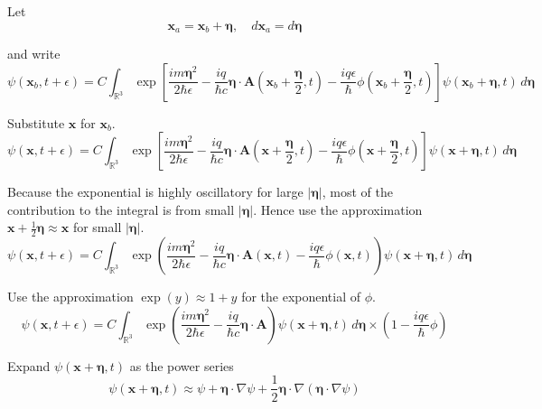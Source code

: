 Let
\begin{equation*}
\mathbf x_a=\mathbf x_b+\boldsymbol\eta,\quad
d\mathbf x_a=d\boldsymbol\eta
\end{equation*}

and write
\begin{equation*}
\psi(\mathbf x_b,t+\epsilon)
=C\int_{\mathbb R^3}
\exp\left[\frac{im\boldsymbol\eta^2}{2\hbar\epsilon}
-\frac{iq}{\hbar c}
\boldsymbol\eta\cdot\mathbf A\left(\mathbf x_b+\frac{\boldsymbol\eta}{2},t\right)
-\frac{iq\epsilon}{\hbar}\phi\left(\mathbf x_b+\frac{\boldsymbol\eta}{2},t\right)
\right]
\psi(\mathbf x_b+\boldsymbol\eta,t)
\,d\boldsymbol\eta
\end{equation*}

Substitute $\mathbf x$ for $\mathbf x_b$.
\begin{equation*}
\psi(\mathbf x,t+\epsilon)
=C\int_{\mathbb R^3}
\exp\left[\frac{im\boldsymbol\eta^2}{2\hbar\epsilon}
-\frac{iq}{\hbar c}
\boldsymbol\eta\cdot\mathbf A\left(\mathbf x+\frac{\boldsymbol\eta}{2},t\right)
-\frac{iq\epsilon}{\hbar}\phi\left(\mathbf x+\frac{\boldsymbol\eta}{2},t\right)
\right]
\psi(\mathbf x+\boldsymbol\eta,t)
\,d\boldsymbol\eta
\end{equation*}

Because the exponential is highly oscillatory for large $|\boldsymbol\eta|$,
most of the contribution to the integral is from small $|\boldsymbol\eta|$.
Hence use the approximation $\mathbf x+\tfrac{1}{2}\boldsymbol\eta\approx\mathbf x$
for small $|\boldsymbol\eta|$.
\begin{equation*}
\psi(\mathbf x,t+\epsilon)
=C\int_{\mathbb R^3}
\exp\left(\frac{im\boldsymbol\eta^2}{2\hbar\epsilon}
-\frac{iq}{\hbar c}
\boldsymbol\eta\cdot\mathbf A(\mathbf x,t)
-\frac{iq\epsilon}{\hbar}\phi\left(\mathbf x,t\right)
\right)
\psi(\mathbf x+\boldsymbol\eta,t)
\,d\boldsymbol\eta
\end{equation*}

Use the approximation $\exp(y)\approx1+y$ for the exponential of $\phi$.
\begin{equation*}
\psi(\mathbf x,t+\epsilon)
=C\int_{\mathbb R^3}
\exp\left(\frac{im\boldsymbol\eta^2}{2\hbar\epsilon}
-\frac{iq}{\hbar c}
\boldsymbol\eta\cdot\mathbf A
\right)
\psi(\mathbf x+\boldsymbol\eta,t)
\,d\boldsymbol\eta
\times\left(1-\frac{iq\epsilon}{\hbar}\phi\right)
\end{equation*}

Expand $\psi(\mathbf x+\boldsymbol\eta,t)$ as the power series
\begin{equation*}
\psi(\mathbf x+\boldsymbol\eta,t)\approx
\psi
+\boldsymbol\eta\cdot\nabla\psi
+\frac{1}{2}\boldsymbol\eta\cdot\nabla(\boldsymbol\eta\cdot\nabla\psi)
\end{equation*}


